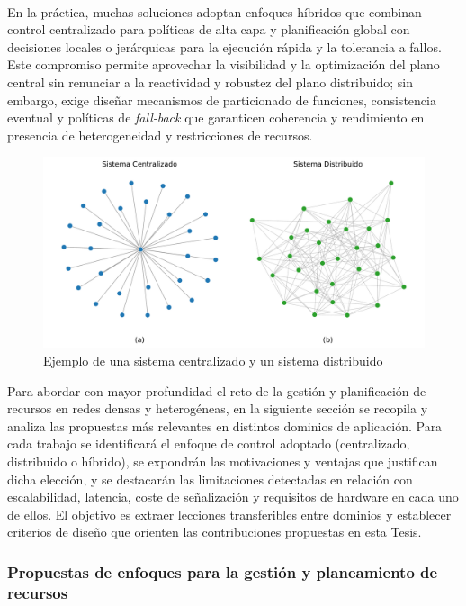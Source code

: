 \\
En la práctica, muchas soluciones adoptan enfoques híbridos que combinan control centralizado para políticas de alta capa y planificación global con decisiones locales o jerárquicas para la ejecución rápida y la tolerancia a fallos. Este compromiso permite aprovechar la visibilidad y la optimización del plano central sin renunciar a la reactividad y robustez del plano distribuido; sin embargo, exige diseñar mecanismos de particionado de funciones, consistencia eventual y políticas de \textit{fall-back} que garanticen coherencia y rendimiento en presencia de heterogeneidad y restricciones de recursos.

\begin{figure}[ht!]
   \centering
   \includegraphics[width=\textwidth]{fig/02_sota/sota_9_redes_centr_dist.pdf}
   \caption{Ejemplo de una sistema centralizado y un sistema distribuido}
   \label{fig:sota_9_redes_centr_dist}
\end{figure}

Para abordar con mayor profundidad el reto de la gestión y planificación de recursos en redes densas y heterogéneas, en la siguiente sección se recopila y analiza las propuestas más relevantes en distintos dominios de aplicación. Para cada trabajo se identificará el enfoque de control adoptado (centralizado, distribuido o híbrido), se expondrán las motivaciones y ventajas que justifican dicha elección, y se destacarán las limitaciones detectadas en relación con escalabilidad, latencia, coste de señalización y requisitos de hardware en cada uno de ellos. El objetivo es extraer lecciones transferibles entre dominios y establecer criterios de diseño que orienten las contribuciones propuestas en esta Tesis.

\subsubsection{Propuestas de enfoques para la gestión y planeamiento de recursos}
\label{subsubsec:propuestas_recursos}


